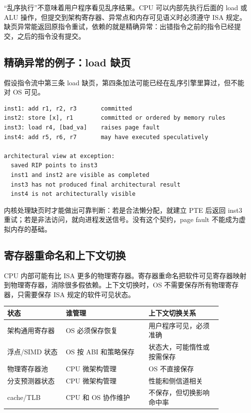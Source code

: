 “乱序执行”不意味着用户程序看见乱序结果。CPU 可以内部先执行后面的 load 或 ALU 操作，但提交到架构寄存器、异常点和内存可见语义时必须遵守 ISA 规定。缺页异常能返回原指令重试，依赖的就是精确异常：出错指令之前的指令已经提交，之后的指令没有提交。

\subsection{精确异常的例子：load 缺页}

假设指令流中第三条 load 缺页，第四条加法可能已经在乱序引擎里算过，但不能对 OS 可见。

\begin{lstlisting}
inst1: add r1, r2, r3       committed
inst2: store [x], r1        committed or ordered by memory rules
inst3: load r4, [bad_va]    raises page fault
inst4: add r5, r6, r7       may have executed speculatively

architectural view at exception:
  saved RIP points to inst3
  inst1 and inst2 are visible as completed
  inst3 has not produced final architectural result
  inst4 is not architecturally visible
\end{lstlisting}

内核处理缺页时才能做出可靠判断：若是合法懒分配，就建立 PTE 后返回 inst3 重试；若是非法访问，就向进程发送信号。没有这个契约，page fault 不能成为虚拟内存的基础。

\subsection{寄存器重命名和上下文切换}

CPU 内部可能有比 ISA 更多的物理寄存器。寄存器重命名把软件可见寄存器映射到物理寄存器，消除很多假依赖。上下文切换时，OS 不需要保存所有物理寄存器，只需要保存 ISA 规定的软件可见状态。

\begin{longtable}{p{0.24\linewidth}p{0.34\linewidth}p{0.3\linewidth}}
\toprule
状态 & 谁管理 & 上下文切换关系 \\
\midrule
架构通用寄存器 & OS 必须保存恢复 & 用户程序可见，必须准确 \\
浮点/SIMD 状态 & OS 按 ABI 和策略保存 & 状态大，可能惰性或按需保存 \\
物理寄存器池 & CPU 微架构管理 & OS 不直接保存 \\
分支预测器状态 & CPU 微架构管理 & 性能和侧信道相关 \\
cache/TLB & CPU 和 OS 协作维护 & 不保存，但切换影响命中率 \\
\bottomrule
\end{longtable}

